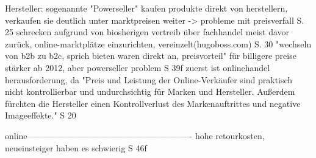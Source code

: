 Hersteller: sogenannte "Powerseller" kaufen produkte direkt von herstellern, verkaufen sie deutlich unter marktpreisen weiter -> probleme mit preisverfall S. 25
        schrecken aufgrund von biosherigen vertreib über fachhandel meist davor zurück, online-marktplätze einzurichten, vereinzelt(hugoboss.com) S. 30
            "wechseln von b2b zu b2c, sprich bieten waren direkt an, preisvorteil" für billigere preise
        stärker ab 2012, aber powerseller problem S 39f
zuerst ist onlinehandel herausforderung, da "Preis und Leistung der Online-Verkäufer sind praktisch nicht kontrollierbar und undurchsichtig für Marken und Hersteller. Außerdem fürchten die Hersteller einen Kontrollverlust des Markenauftrittes und negative Imageeffekte." S 20



       online----------------------------------------------------------
            hohe retourkosten, neueinsteiger haben es schwierig S 46f
\fi
